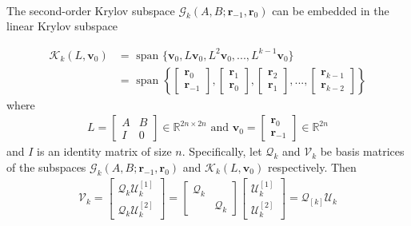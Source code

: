 \paragraph*{}
The second-order Krylov subspace $\mathcal{G}_k(A,B;\mathbf{r}_{-1},\mathbf{r}_{0})$ can be embedded in the linear Krylov subspace

\begin{align}
\mathcal{K}_k(L, \mathbf{v}_0) & = \text{ span }\{ \mathbf{v}_0, L\mathbf{v}_0,L^2\mathbf{v}_0,...,L^{k-1}\mathbf{v}_0 \} \\
    & =\text{ span } \left\{ 
    \begin{bmatrix} \mathbf{r}_{0} \\ \mathbf{r}_{-1} \end{bmatrix},
    \begin{bmatrix} \mathbf{r}_{1} \\ \mathbf{r}_{0} \end{bmatrix},
    \begin{bmatrix} \mathbf{r}_{2} \\ \mathbf{r}_{1} \end{bmatrix},
    ...,
    \begin{bmatrix} \mathbf{r}_{k-1} \\ \mathbf{r}_{k-2} \end{bmatrix}
    \right\}
\end{align}
where
\begin{align*}
    L = \begin{bmatrix}
        A & B \\
        I & 0
    \end{bmatrix} \in \mathbb{R}^{2n\times 2n} \text{ and } \mathbf{v}_0 = \begin{bmatrix} \mathbf{r}_{0} \\ \mathbf{r}_{-1} \end{bmatrix} \in  \mathbb{R}^{2n}
\end{align*}
and $I$ is an identity matrix of size $n$. Specifically, let $\mathcal{Q}_k$ and $\mathcal{V}_k$ be basis matrices of the subspaces $\mathcal{G}_k(A,B;\mathbf{r}_{-1},\mathbf{r}_{0})$ and $\mathcal{K}_k(L, \mathbf{v}_0)$ respectively. Then
\begin{align}\label{eq:VQU}
    \mathcal{V}_k = \begin{bmatrix} 
        \mathcal{Q}_k\mathcal{U}_k^{[1]} \\
        \mathcal{Q}_k\mathcal{U}_k^{[2]}
    \end{bmatrix} = \begin{bmatrix}
        \mathcal{Q}_k & \\
        & \mathcal{Q}_k
    \end{bmatrix} \begin{bmatrix}
        \mathcal{U}_k^{[1]} \\
        \mathcal{U}_k^{[2]}
    \end{bmatrix} = \mathcal{Q}_{[k]}\mathcal{U}_k
\end{align}
